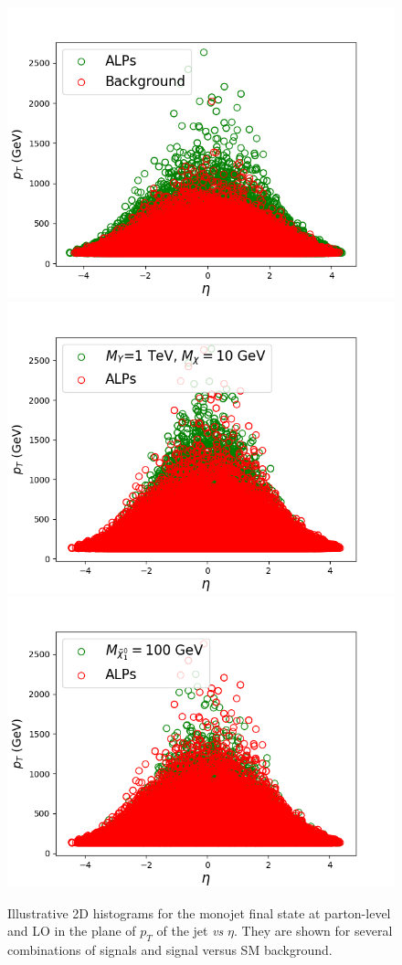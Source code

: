 \documentclass[prd,aps,letterpaper,floatfix,superscriptaddress,preprintnumbers,twocolumn,10pt,nofootinbib]{revtex4-1}
\begin{document}
\begin{figure} [t!]
\includegraphics[scale=0.32]{figures/ptjetajsmaxion.png}
\includegraphics[scale=0.32]{figures/ptjetajaxspin1.png}
\includegraphics[scale=0.32]{figures/ptjetajaxsusy1.png}
\caption{Illustrative 2D histograms for the monojet final state at parton-level and LO in the plane of $p_T$ of the jet {\it vs} $\eta$. They are shown for several combinations of signals and signal  versus SM background.\label{1Dand2DfeaturesPL2}}
\end{figure}
\end{document}
